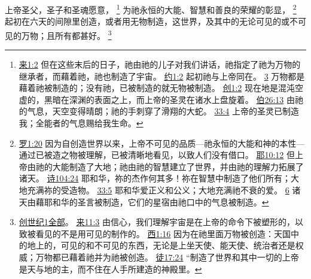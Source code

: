 \documentclass[12pt, a4paper, oneside]{ctexart}
\newcounter{parnum}[section]
\newcommand{\N}{%
   \noindent\refstepcounter{parnum}%
    \makebox[\parindent][l]{\textbf{\arabic{parnum}.}}}
\begin{document}
\N 上帝圣父，圣子和圣魂愿意，
	\footnote {
		\href{https://biblehub.com/hebrews/1-2.htm}{来1:2} 但在这些末后的日子，祂由祂的儿子对我们讲话，祂指定了祂为万物的继承者，而藉着祂，祂也制造了宇宙。
		\href{https://biblehub.com/john/1-2.htm}{约1:2} 起初祂与上帝同在。
		\href{https://biblehub.com/john/1-3.htm}{3} 万物都是藉着祂被制造的；没有祂，已被制造的就无物被制造。
		\href{https://biblehub.com/genesis/1-2.htm}{创1:2} 现在地是混沌空虚的，黑暗在深渊的表面之上，而上帝的圣灵在诸水上盘旋着。
		\href{https://biblehub.com/job/26-13.htm}{伯26:13} 由祂的气息，天空变得晴朗；祂的手刺穿了滑翔的大蛇。
		\href{https://biblehub.com/job/33-4.htm}{33:4} 上帝的圣灵已制造我；全能者的气息赐给我生命。
	}
	为祂永恒的大能、智慧和善良的荣耀的彰显，
	\footnote {
		\href{https://biblehub.com/romans/1-20.htm}{罗1:20} 因为自创造世界以来，上帝不可见的品质---祂永恒的大能和神的本性---通过已被造之物被理解，已被清晰地看见，以致人们没有借口。
		\href{https://biblehub.com/jeremiah/10-12.htm}{耶10:12} 但上帝由祂的大能制造了大地；祂由祂的智慧建立了世界，并由祂的理解力拓展了诸天。
		\href{https://biblehub.com/psalms/104-24.htm}{诗104:24} 耶和华，祢的杰作何其多！祢在智慧中制造了他们所有；大地充满祢的受造物。
		\href{https://biblehub.com/psalms/33-5.htm}{33:5} 耶和华爱正义和公义；大地充满祂不衰的爱。
		\href{https://biblehub.com/psalms/33-6.htm}{6} 诸天由藉耶和华的圣言被制造，它们的星宿由祂口中的气息被制造。
	}
	起初在六天的间隙里创造，或者用无物制造，这世界，及其中的无论可见的或不可见的万物；且所有都甚好。
	\footnote {
		\href{https://biblehub.com/niv/genesis/1.htm}{创世纪1全部}。
		\href{https://biblehub.com/hebrews/11-3.htm}{来11:3} 由信心，我们理解宇宙是在上帝的命令下被塑形的，以致被看见的不是用可见的制作的。
		\href{https://biblehub.com/colossians/1-16.htm}{西1:16} 因为在祂里面万物被创造：天国中的地上的，可见的和不可见的东西，无论是上坐天使、能天使、统治者还是权威；万物都已藉着祂并为祂被创造。
		\href{https://biblehub.com/acts/17-24.htm}{徒17:24} “制造了世界和其中一切的上帝是天与地的主，而不住在人手所建造的神殿里。
	}
\end{document}

